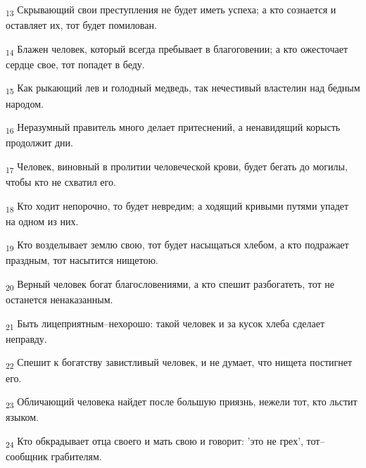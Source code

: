\begin{tcolorbox}
\textsubscript{13} Скрывающий свои преступления не будет иметь успеха; а кто сознается и оставляет их, тот будет помилован.
\end{tcolorbox}
\begin{tcolorbox}
\textsubscript{14} Блажен человек, который всегда пребывает в благоговении; а кто ожесточает сердце свое, тот попадет в беду.
\end{tcolorbox}
\begin{tcolorbox}
\textsubscript{15} Как рыкающий лев и голодный медведь, так нечестивый властелин над бедным народом.
\end{tcolorbox}
\begin{tcolorbox}
\textsubscript{16} Неразумный правитель много делает притеснений, а ненавидящий корысть продолжит дни.
\end{tcolorbox}
\begin{tcolorbox}
\textsubscript{17} Человек, виновный в пролитии человеческой крови, будет бегать до могилы, чтобы кто не схватил его.
\end{tcolorbox}
\begin{tcolorbox}
\textsubscript{18} Кто ходит непорочно, то будет невредим; а ходящий кривыми путями упадет на одном из них.
\end{tcolorbox}
\begin{tcolorbox}
\textsubscript{19} Кто возделывает землю свою, тот будет насыщаться хлебом, а кто подражает праздным, тот насытится нищетою.
\end{tcolorbox}
\begin{tcolorbox}
\textsubscript{20} Верный человек богат благословениями, а кто спешит разбогатеть, тот не останется ненаказанным.
\end{tcolorbox}
\begin{tcolorbox}
\textsubscript{21} Быть лицеприятным--нехорошо: такой человек и за кусок хлеба сделает неправду.
\end{tcolorbox}
\begin{tcolorbox}
\textsubscript{22} Спешит к богатству завистливый человек, и не думает, что нищета постигнет его.
\end{tcolorbox}
\begin{tcolorbox}
\textsubscript{23} Обличающий человека найдет после большую приязнь, нежели тот, кто льстит языком.
\end{tcolorbox}
\begin{tcolorbox}
\textsubscript{24} Кто обкрадывает отца своего и мать свою и говорит: 'это не грех', тот--сообщник грабителям.
\end{tcolorbox}

